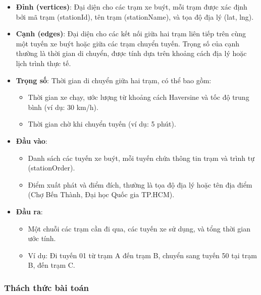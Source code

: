 \documentclass[a4paper,12pt]{article}
\begin{document}
\begin{itemize}
    \item \textbf{Đỉnh (vertices)}: Đại diện cho các trạm xe buýt, mỗi trạm được xác định bởi mã trạm (stationId), tên trạm (stationName), và tọa độ địa lý (lat, lng).
    \item \textbf{Cạnh (edges)}: Đại diện cho các kết nối giữa hai trạm liên tiếp trên cùng một tuyến xe buýt hoặc giữa các trạm chuyển tuyến. Trọng số của cạnh thường là thời gian di chuyển, được tính dựa trên khoảng cách địa lý hoặc lịch trình thực tế.
    \item \textbf{Trọng số}: Thời gian di chuyển giữa hai trạm, có thể bao gồm:
    \begin{itemize}
        \item Thời gian xe chạy, ước lượng từ khoảng cách Haversine và tốc độ trung bình (ví dụ: 30 km/h).
        \item Thời gian chờ khi chuyển tuyến (ví dụ: 5 phút).
    \end{itemize}
    \item \textbf{Đầu vào}:
    \begin{itemize}
        \item Danh sách các tuyến xe buýt, mỗi tuyến chứa thông tin trạm và trình tự (stationOrder).
        \item Điểm xuất phát và điểm đích, thường là tọa độ địa lý hoặc tên địa điểm (Chợ Bến Thành, Đại học Quốc gia TP.HCM).
    \end{itemize}
    \item \textbf{Đầu ra}:
    \begin{itemize}
        \item Một chuỗi các trạm cần đi qua, các tuyến xe sử dụng, và tổng thời gian ước tính.
        \item Ví dụ: Đi tuyến 01 từ trạm A đến trạm B, chuyển sang tuyến 50 tại trạm B, đến trạm C.
    \end{itemize}
\end{itemize}

\subsubsection{Thách thức bài toán}
\end{document}
